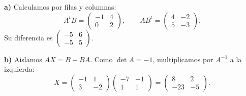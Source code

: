 \textbf{a)} Calculamos por filas y columnas:
\[
A^tB=\begin{pmatrix}-1&4\\0&2\end{pmatrix},
\qquad AB^t=\begin{pmatrix}4&-2\\5&-3\end{pmatrix}.
\]
Su diferencia es $\boxed{\begin{pmatrix}-5&6\\-5&5\end{pmatrix}}$.

\textbf{b)} Aislamos $AX=B-BA$. Como $\det A=-1$, multiplicamos por $A^{-1}$ a la izquierda:
\[
X=\begin{pmatrix}-1&1\\3&-2\end{pmatrix}
\begin{pmatrix}-7&-1\\1&1\end{pmatrix}
=\boxed{\begin{pmatrix}8&2\\-23&-5\end{pmatrix}}.
\]
